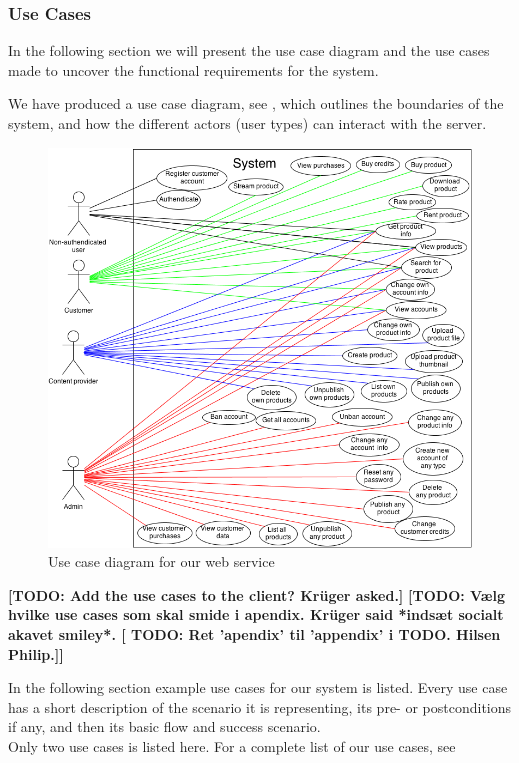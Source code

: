 \subsubsection{Use Cases}
In the following section we will present the use case diagram and the use cases made to uncover the functional requirements for the system.

We have produced a use case diagram, see , which outlines the boundaries of the system, and how the different actors (user types) can interact with the server. 
\begin{figure}[h]
\centering
\includegraphics[scale=0.5]{illustrations/UseCaseDiagram.png}
\caption{Use case diagram for our web service}
\label{useCaseImg}
\end{figure}

\textbf{[TODO: Add the use cases to the client? Krüger asked.]}
\textbf{[TODO: Vælg hvilke use cases som skal smide i apendix. Krüger said *indsæt socialt akavet smiley*. [ TODO: Ret 'apendix' til 'appendix' i TODO. Hilsen Philip.]]}

In the following section example use cases for our system is listed. Every use case has a short description of the scenario it is representing, its pre- or postconditions if any, and then its basic flow and success scenario.\\
Only two use cases is listed here. For a complete list of our use cases, see 


